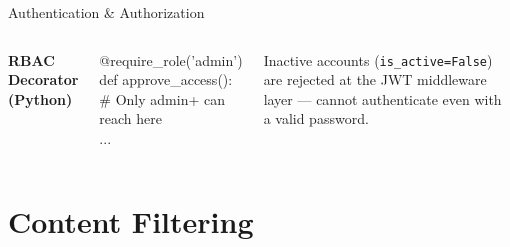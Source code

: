 \documentclass[aspectratio=169,12pt]{beamer}
\begin{document}
\begin{frame}{Authentication \& Authorization}
\begin{columns}[t]
\vspace{8pt}
\small\bfseries RBAC Decorator (Python)
\vspace{4pt}
\begin{tcolorbox}[colback=CodeBg,colframe=CardBorder,arc=4pt,
  left=4pt,right=4pt,top=4pt,bottom=4pt]
\ttfamily\scriptsize
\textcolor{AccentBlue}{@require\_role}(\textcolor{SuccessGreen}{'admin'})\\
\textcolor{BPDark}{def} \textcolor{AccentBlue}{approve\_access}():\\
\quad \textcolor{TextMid}{\# Only admin+ can reach here}\\
\quad ...
\end{tcolorbox}

\vspace{8pt}
\begin{tcolorbox}[colback=AccentRed!8,colframe=AccentRed,arc=4pt,
  left=4pt,right=4pt,top=3pt,bottom=3pt]
\scriptsize\centering Inactive accounts (\texttt{is\_active=False}) are rejected at the JWT middleware layer --- cannot authenticate even with a valid password.
\end{tcolorbox}
\end{columns}
\end{frame}

\section{Content Filtering}
\end{document}
